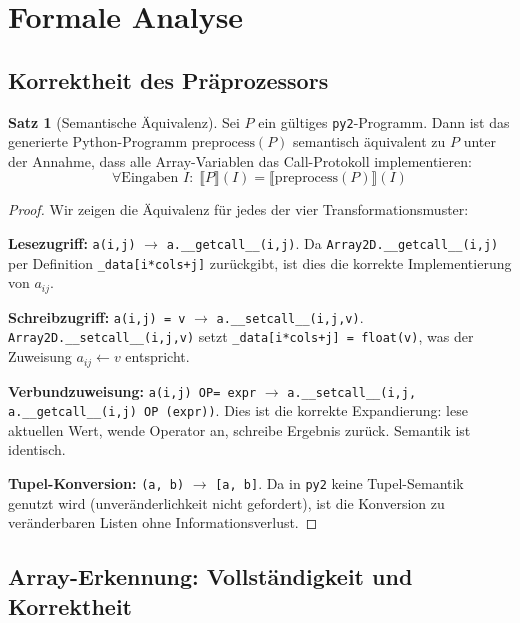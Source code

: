 \documentclass[a4paper,12pt]{article}
\theoremstyle{definition}
\newtheorem{satz}{Satz}
\begin{document}
\section{Formale Analyse}

\subsection{Korrektheit des Pr\"aprozessors}

\begin{satz}[Semantische \"Aquivalenz]
	Sei $P$ ein g\"ultiges \texttt{py2}-Programm. Dann ist das generierte Python-Programm
	$\text{preprocess}(P)$ semantisch \"aquivalent zu $P$ unter der Annahme, dass alle
	Array-Variablen das Call-Protokoll implementieren:
	\[
		\forall \text{Eingaben } I: \;\llbracket P \rrbracket(I) = \llbracket \text{preprocess}(P) \rrbracket(I)
	\]
\end{satz}

\begin{proof}
	Wir zeigen die \"Aquivalenz f\"ur jedes der vier Transformationsmuster:

	\textbf{Lesezugriff:} \texttt{a(i,j)} $\to$ \texttt{a.\_\_getcall\_\_(i,j)}.
	Da \texttt{Array2D.\_\_getcall\_\_(i,j)} per Definition \texttt{\_data[i*cols+j]}
	zur\"uckgibt, ist dies die korrekte Implementierung von $a_{ij}$.

	\textbf{Schreibzugriff:} \texttt{a(i,j) = v} $\to$ \texttt{a.\_\_setcall\_\_(i,j,v)}.
	\texttt{Array2D.\_\_setcall\_\_(i,j,v)} setzt \texttt{\_data[i*cols+j] = float(v)},
	was der Zuweisung $a_{ij} \leftarrow v$ entspricht.

	\textbf{Verbundzuweisung:} \texttt{a(i,j) OP= expr} $\to$
	\texttt{a.\_\_setcall\_\_(i,j, a.\_\_getcall\_\_(i,j) OP (expr))}.
	Dies ist die korrekte Expandierung: lese aktuellen Wert, wende Operator an,
	schreibe Ergebnis zur\"uck. Semantik ist identisch.

	\textbf{Tupel-Konversion:} \texttt{(a, b)} $\to$ \texttt{[a, b]}.
	Da in \texttt{py2} keine Tupel-Semantik genutzt wird (unveränderlichkeit nicht
	gefordert), ist die Konversion zu ver\"anderbaren Listen ohne Informationsverlust.
\end{proof}

\subsection{Array-Erkennung: Vollst\"andigkeit und Korrektheit}
\end{document}
